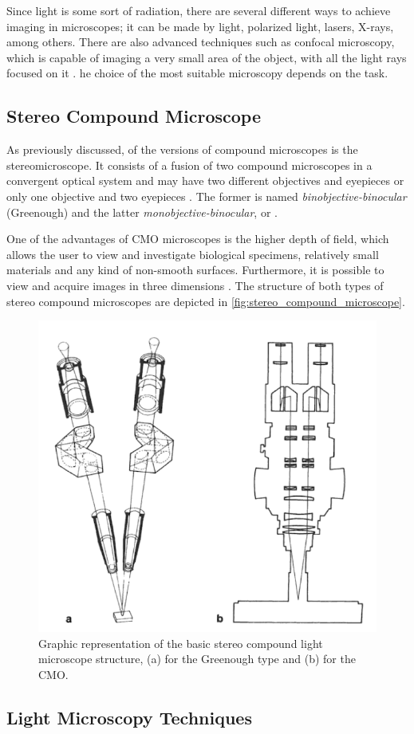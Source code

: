 Since light is some sort of radiation, there are several different ways to achieve imaging in microscopes; it can be made by light, polarized light, lasers, X-rays, among others. There are also advanced techniques such as confocal microscopy, which is capable of imaging a very small area of the object, with all the light rays focused on it \cite{rochow1994introduction}. he choice of the most suitable microscopy depends on the task.

\subsection{Stereo Compound Microscope}

As previously discussed, of the versions of compound microscopes is the stereomicroscope. It consists of a fusion of two compound microscopes in a convergent optical system and may have two different objectives and eyepieces or only one objective and two eyepieces \cite{schreier2004advances}. The former is named \emph{binobjective-binocular} (Greenough) and the latter \emph{monobjective-binocular}, or . 

One of the advantages of CMO microscopes is the higher depth of field, which allows the user to view and investigate biological specimens, relatively small materials and any kind of non-smooth surfaces. Furthermore, it is possible to view and acquire images in three dimensions \cite{rochow1994introduction}. The structure of both types of stereo compound microscopes are depicted in \autoref{fig:stereo_compound_microscope}.

\begin{figure}[htb]
	\centering
	\caption{\label{fig:stereo_compound_microscope} Graphic representation of the basic stereo compound light microscope structure, (a) for the Greenough type and (b) for the CMO.}
	\begin{center}
	    \includegraphics[scale=0.45]{images/fig6.png}
	\end{center}
	\centering
\end{figure}


\subsection{Light Microscopy Techniques}

